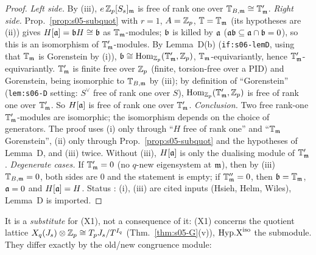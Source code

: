 \begin{proof}
\emph{Left side.} By (iii), $e\,\mathbb{Z}_p[S_s]_{\mathfrak{m}}$ is free of rank one over $\mathbb{T}_{B,\mathfrak{m}}\cong\mathbb{T}'_{\mathfrak{m}}$.
\emph{Right side.} Prop.~\ref{prop:s05-subquot} with $r=1$, $A=\mathbb{Z}_p$, $\mathbb{T}=\mathbb{T}_{\mathfrak{m}}$ (its hypotheses are (ii)) gives $H[\mathfrak{a}]=\mathfrak{b} H\cong\mathfrak{b}$ as
$\mathbb{T}_{\mathfrak{m}}$-modules; $\mathfrak{b}$ is killed by $\mathfrak{a}$ ($\mathfrak{a}\mathfrak{b}\subseteq\mathfrak{a}\cap\mathfrak{b}=0$), so this is an isomorphism of $\mathbb{T}'_{\mathfrak{m}}$-modules. By Lemma~D(b)
(\texttt{if:s06-lemD}, using that $\mathbb{T}_{\mathfrak{m}}$ is Gorenstein by (i)), $\mathfrak{b}\cong\operatorname{Hom}_{\mathbb{Z}_p}(\mathbb{T}'_{\mathfrak{m}},\mathbb{Z}_p)$, $\mathbb{T}_{\mathfrak{m}}$-equivariantly, hence
$\mathbb{T}'_{\mathfrak{m}}$-equivariantly. $\mathbb{T}'_{\mathfrak{m}}$ is finite free over $\mathbb{Z}_p$ (finite, torsion-free over a PID) and Gorenstein, being isomorphic to
$\mathbb{T}_{B,\mathfrak{m}}$ by (iii); by definition of ``Gorenstein'' (\texttt{lem:s06-D} setting: $S^\vee$ free of rank one over $S$),
$\operatorname{Hom}_{\mathbb{Z}_p}(\mathbb{T}'_{\mathfrak{m}},\mathbb{Z}_p)$ is free of rank one over $\mathbb{T}'_{\mathfrak{m}}$. So $H[\mathfrak{a}]$ is free of rank one over $\mathbb{T}'_{\mathfrak{m}}$.
\emph{Conclusion.} Two free rank-one $\mathbb{T}'_{\mathfrak{m}}$-modules are isomorphic; the isomorphism depends on the choice of generators. The proof
uses (i) only through ``$H$ free of rank one'' and ``$\mathbb{T}_{\mathfrak{m}}$ Gorenstein'', (ii) only through Prop.~\ref{prop:s05-subquot} and the
hypotheses of Lemma~D, and (iii) twice. Without (iii), $H[\mathfrak{a}]$ is only the dualising module of $\mathbb{T}'_{\mathfrak{m}}$.
\emph{Degenerate cases.} If $\mathbb{T}'_{\mathfrak{m}}=0$ (no $q$-new eigensystem at $\mathfrak{m}$), then by (iii) $\mathbb{T}_{B,\mathfrak{m}}=0$, both sides are $0$ and the statement is
empty; if $\mathbb{T}''_{\mathfrak{m}}=0$, then $\mathfrak{b}=\mathbb{T}_{\mathfrak{m}}$, $\mathfrak{a}=0$ and $H[\mathfrak{a}]=H$.
Status \stpmc: (i), (iii) are cited inputs (Hsieh, Helm, Wiles), Lemma~D is imported.
\end{proof}
It is a \emph{substitute} for (X1), not a consequence of it: (X1) concerns the quotient lattice $X_q(J_s)\otimes\mathbb{Z}_p\cong T_pJ_s/T^{I_q}$
(Thm.~\ref{thm:s05-G}(v)), $\mathrm{Hyp.X}^{\mathrm{iso}}$ the submodule. They differ exactly by the old/new congruence module:


